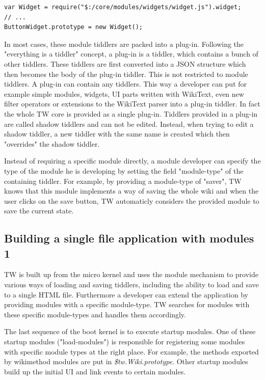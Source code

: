 \documentclass[12pt,a4paper]{article}
\begin{document}
\begin{lstlisting}[caption={Import other modules by using require()},label=lst:require]
var Widget = require("$:/core/modules/widgets/widget.js").widget;
// ...
ButtonWidget.prototype = new Widget();
\end{lstlisting}

In most cases, these module tiddlers are packed into a plug-in.
Following the "everything is a tiddler" concept, a plug-in is a tiddler, which contains a bunch of other tiddlers. These tiddlers are first converted into a JSON structure which then becomes the body of the plug-in tiddler.
This is not restricted to module tiddlers. A plug-in can contain any tiddlers. This way a developer can put for example simple modules, widgets, UI parts written with WikiText, even new filter operators or extensions to the WikiText parser into a plug-in tiddler. In fact the whole TW core is provided as a single plug-in. Tiddlers provided in a plug-in are called shadow tiddlers and can not be edited. Instead, when trying to edit a shadow tiddler, a new tiddler with the same name is created which then "overrides" the shadow tiddler.

Instead of requiring a specific module directly, a module developer can specify the type of the module he is developing by setting the field "module-type" of the containing tiddler.
For example, by providing a module-type of "saver", TW knows that this module implements a way of saving the whole wiki and when the user clicks on the save button, TW automaticly considers the provided module to save the current state.

\subsection{Building a single file application with modules 1}
TW is built up from the micro kernel and uses the module mechanism to provide various ways of loading and saving tiddlers, including the ability to load and save to a single HTML file.
Furthermore a developer can extend the application by providing modules with a specific module-type. TW searches for modules with these specific module-types and handles them accordingly.

The last sequence of the boot kernel is to execute startup modules. One of these startup modules ("load-modules") is responsible for registering some modules with specific module types at the right place. For example, the methods exported by wikimethod modules are put in \textit{\$tw.Wiki.prototype}. Other startup modules build up the initial UI and link events to certain modules.
\end{document}
